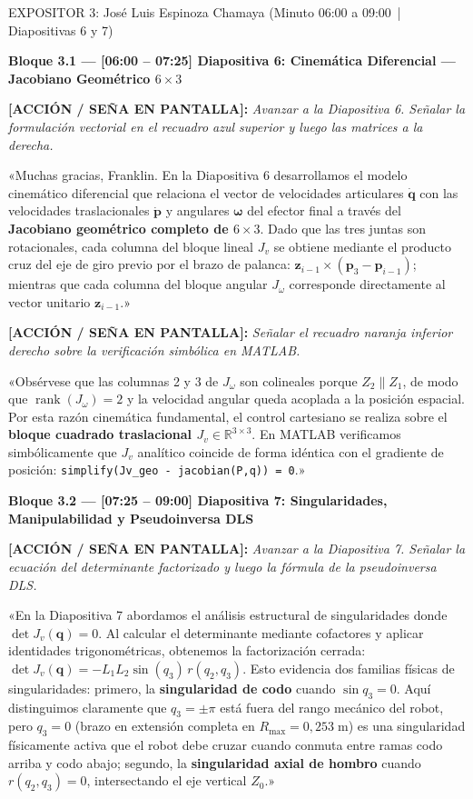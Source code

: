 \documentclass[11pt,a4paper]{article}
\newcommand{\accion}[1]{%
  \par\smallskip\noindent%
  {\color{uniGranate}\textbf{[ACCIÓN / SEÑA EN PANTALLA]:}} {\itshape\color{uniAzul!90!black} #1}\par\smallskip%
}
\newcommand{\speech}[1]{%
  \noindent{\color{verdeOk!85!black}\textbf{[SPEECH]:}} «#1»\par\medskip%
}
\begin{document}
\begin{cajaexpositor}[uniAzulC]{EXPOSITOR 3: José Luis Espinoza Chamaya (Minuto 06:00 a 09:00 \,|\, Diapositivas 6 y 7)}

\textbf{\color{uniAzulC}Bloque 3.1 --- [06:00 -- 07:25] Diapositiva 6: Cinemática Diferencial --- Jacobiano Geométrico $6\times 3$}
\accion{Avanzar a la Diapositiva 6. Señalar la formulación vectorial en el recuadro azul superior y luego las matrices a la derecha.}
\speech{Muchas gracias, Franklin. En la Diapositiva 6 desarrollamos el modelo cinemático diferencial que relaciona el vector de velocidades articulares $\dot{\bm{q}}$ con las velocidades traslacionales $\dot{\bm{p}}$ y angulares $\bm{\omega}$ del efector final a través del \textbf{Jacobiano geométrico completo de $6\times 3$}. Dado que las tres juntas son rotacionales, cada columna del bloque lineal $J_v$ se obtiene mediante el producto cruz del eje de giro previo por el brazo de palanca: $\bm{z}_{i-1} \times (\bm{p}_3 - \bm{p}_{i-1})$; mientras que cada columna del bloque angular $J_\omega$ corresponde directamente al vector unitario $\bm{z}_{i-1}$.}

\accion{Señalar el recuadro naranja inferior derecho sobre la verificación simbólica en MATLAB.}
\speech{Obsérvese que las columnas 2 y 3 de $J_\omega$ son colineales porque $Z_2 \parallel Z_1$, de modo que $\operatorname{rank}(J_\omega) = 2$ y la velocidad angular queda acoplada a la posición espacial. Por esta razón cinemática fundamental, el control cartesiano se realiza sobre el \textbf{bloque cuadrado traslacional $J_v \in \mathbb{R}^{3\times 3}$}. En MATLAB verificamos simbólicamente que $J_v$ analítico coincide de forma idéntica con el gradiente de posición: \texttt{simplify(Jv\_geo - jacobian(P,q)) = 0}.}

\textbf{\color{uniAzulC}Bloque 3.2 --- [07:25 -- 09:00] Diapositiva 7: Singularidades, Manipulabilidad y Pseudoinversa DLS}
\accion{Avanzar a la Diapositiva 7. Señalar la ecuación del determinante factorizado y luego la fórmula de la pseudoinversa DLS.}
\speech{En la Diapositiva 7 abordamos el análisis estructural de singularidades donde $\det J_v(\bm{q}) = 0$. Al calcular el determinante mediante cofactores y aplicar identidades trigonométricas, obtenemos la factorización cerrada: $\det J_v(\bm{q}) = -L_1 L_2 \sin(q_3)\, r(q_2, q_3)$. Esto evidencia dos familias físicas de singularidades: primero, la \textbf{singularidad de codo} cuando $\sin q_3 = 0$. Aquí distinguimos claramente que $q_3 = \pm\pi$ está fuera del rango mecánico del robot, pero $q_3 = 0$ (brazo en extensión completa en $R_{\max} = 0{,}253\;\text{m}$) es una singularidad físicamente activa que el robot debe cruzar cuando conmuta entre ramas codo arriba y codo abajo; segundo, la \textbf{singularidad axial de hombro} cuando $r(q_2, q_3) = 0$, intersectando el eje vertical $Z_0$.}


\end{cajaexpositor}
\end{document}
